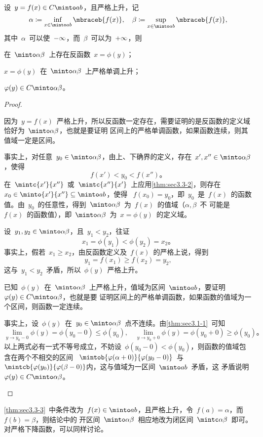 \begin{theorem}\label{thm:sec3.3-3}
设~$y=f(x)\in C\minto ab$，且严格上升，记
\[
  \alpha\coloneq\inf_{x\in\minto ab}\mbraceb{f(x)},\quad\beta\coloneq\sup_{x\in\minto ab}\mbraceb{f(x)},
\]
其中~$\alpha$~可以使~${-\infty}$，而~$\beta$~可以为~${+\infty}$，则
\begin{enumlistcols}
\item 在~$\minto\alpha\beta$~上存在反函数~$x=\phi(y)$；
\item $x=\phi(y)$~在~$\minto\alpha\beta$~上严格单调上升；
\item $\phi(y)\in C\minto\alpha\beta$。
\end{enumlistcols}
\end{theorem}
\begin{proof}
\begin{thmenumlist}
\item 因为~$y=f(x)$~严格上升，所以反函数一定存在，需要证明的是反函数的定义域恰好为~$\minto\alpha\beta$，也就是要证明
区间上的严格单调函数，如果函数连续，则其值域一定是区间。

事实上，对任意~$y_0\in\minto\alpha\beta$，由上、下确界的定义，存在~$x',x''\in\minto\alpha\beta$，使得
\[
  f(x')<y_0<f(x'')。
\]
在~$\mintc{x'}{x''}$~或~$\mintc{x''}{x'}$~上应用\ref{thm:sec3.3-2}，则存在~$x_0\in\minto{x'}{x''}\subset\minto ab$，使得
~$f(x_0)=y_0$，即~$y_0$~是~$f(x)$~的函数值。由~$y_0$~的任意性，得到~$\minto\alpha\beta$~为~$f(x)$~的值域（$\alpha,\beta$~不
可能是~$f(x)$~的函数值），即~$\minto\alpha\beta$~为~$x=\phi(y)$~的定义域。
\item 设~$y_1,y_2\in\minto\alpha\beta$，且~$y_1<y_2$，往证
\[
  x_1=\phi(y_1)<\phi(y_2)=x_2 。
\]
事实上，假若~$x_1\geq x_2$，由反函数定义及~$f(x)$~的严格上说，得到
\[
  y_1=f(x_1)\geq f(x_2)=y_2,
\]
这与~$y_1<y_2$~矛盾，所以~$\phi(y)$~严格上升。
\item 已知~$\phi(y)$~在~$\minto\alpha\beta$~上严格上升，值域为区间~$\minto ab$，要证明~$\phi(y)\in C\minto\alpha\beta$，也就是要
证明区间上的严格单调函数，如果函数的值域为一个区间，则函数一定连续。

事实上，设~$\phi(y)$~在~$y_0\in\minto\alpha\beta$~点不连续。由\ref{thm:sec3.1-1}~可知
\[
  \lim_{y\to y_0-0}\phi(y)=\phi(y_0-0)\leq\phi(y_0),\quad
  \lim_{y\to y_0+0}\phi(y)=\phi(y_0+0)\geq\phi(y_0)。
\]
以上两式必有一式不等号成立，不妨设~$\phi(y_0-0)<\phi(y_0)$，则函数的值域包含在两个不相交的区间
~$\mintob{\phi(\alpha+0)}{\phi(y_0-0)}$~与~$\mintcb{\phi(y_0)}{\phi(\beta-0)}$内，这与值域为一区间~$\minto ab$~矛盾，这
矛盾说明~$\phi(y)\in C\minto\alpha\beta$。\qedhere
\end{thmenumlist}
\end{proof}
\begin{remark}\label{rem:sec3.3-1}
\ref{thm:sec3.3-3}~中条件改为~$f(x)\in\minto ab$，且严格上升，令~$f(a)=\alpha$，而~$f(b)=\beta$，则结论中的
开区间~$\minto\alpha\beta$~相应地改为闭区间~$\mintc\alpha\beta$~即可。对严格下降函数，可以同样讨论。
\end{remark}

